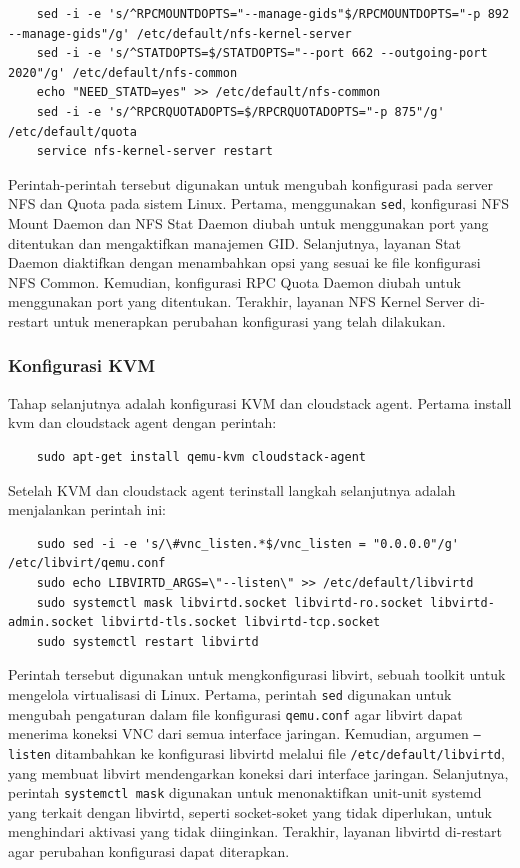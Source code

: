\begin{listing}[H]
    \begin{verbatim}
    sed -i -e 's/^RPCMOUNTDOPTS="--manage-gids"$/RPCMOUNTDOPTS="-p 892 --manage-gids"/g' /etc/default/nfs-kernel-server
    sed -i -e 's/^STATDOPTS=$/STATDOPTS="--port 662 --outgoing-port 2020"/g' /etc/default/nfs-common
    echo "NEED_STATD=yes" >> /etc/default/nfs-common
    sed -i -e 's/^RPCRQUOTADOPTS=$/RPCRQUOTADOPTS="-p 875"/g' /etc/default/quota
    service nfs-kernel-server restart
    \end{verbatim}
\end{listing}

Perintah-perintah tersebut digunakan untuk mengubah konfigurasi pada server NFS dan Quota pada sistem Linux. Pertama, menggunakan \texttt{sed}, konfigurasi NFS Mount Daemon dan NFS Stat Daemon diubah untuk menggunakan port yang ditentukan dan mengaktifkan manajemen GID. Selanjutnya, layanan Stat Daemon diaktifkan dengan menambahkan opsi yang sesuai ke file konfigurasi NFS Common. Kemudian, konfigurasi RPC Quota Daemon diubah untuk menggunakan port yang ditentukan. Terakhir, layanan NFS Kernel Server di-restart untuk menerapkan perubahan konfigurasi yang telah dilakukan.

\subsubsection{Konfigurasi KVM}
Tahap selanjutnya adalah konfigurasi KVM dan cloudstack agent. Pertama install kvm dan cloudstack agent dengan perintah:

\begin{verbatim}
    sudo apt-get install qemu-kvm cloudstack-agent
\end{verbatim}

Setelah KVM dan cloudstack agent terinstall langkah selanjutnya adalah menjalankan perintah ini:

\begin{listing}[H]
    \begin{verbatim}
    sudo sed -i -e 's/\#vnc_listen.*$/vnc_listen = "0.0.0.0"/g' /etc/libvirt/qemu.conf
    sudo echo LIBVIRTD_ARGS=\"--listen\" >> /etc/default/libvirtd
    sudo systemctl mask libvirtd.socket libvirtd-ro.socket libvirtd-admin.socket libvirtd-tls.socket libvirtd-tcp.socket
    sudo systemctl restart libvirtd
    \end{verbatim}
\end{listing}

Perintah tersebut digunakan untuk mengkonfigurasi libvirt, sebuah toolkit untuk mengelola virtualisasi di Linux. Pertama, perintah \texttt{sed} digunakan untuk mengubah pengaturan dalam file konfigurasi \texttt{qemu.conf} agar libvirt dapat menerima koneksi VNC dari semua interface jaringan. Kemudian, argumen \texttt{--listen} ditambahkan ke konfigurasi libvirtd melalui file \texttt{/etc/default/libvirtd}, yang membuat libvirt mendengarkan koneksi dari interface jaringan. Selanjutnya, perintah \texttt{systemctl mask} digunakan untuk menonaktifkan unit-unit systemd yang terkait dengan libvirtd, seperti socket-soket yang tidak diperlukan, untuk menghindari aktivasi yang tidak diinginkan. Terakhir, layanan libvirtd di-restart agar perubahan konfigurasi dapat diterapkan.

